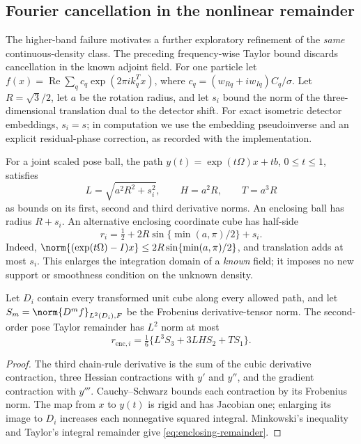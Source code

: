 \subsection{Fourier cancellation in the nonlinear remainder}
\label{app:enclosing-domain}
The higher-band failure motivates a further exploratory refinement of the
\emph{same} continuous-density class. The preceding frequency-wise Taylor
bound discards cancellation in the known adjoint field. For one particle let
\(f(x)=\operatorname{Re}\sum_q c_q\exp(2\pi i k_q^T x)\), where
\(c_q=(w_{Rq}+i w_{Iq})C_q/\sigma\). Let \(R=\sqrt{3}/2\), let \(a\) be
the rotation radius, and let \(s_i\) bound the norm of the three-dimensional
translation dual to the detector shift. For exact isometric detector
embeddings, \(s_i=s\); in computation we use the embedding pseudoinverse and
an explicit residual-phase correction, as recorded with the implementation.

For a joint scaled pose ball, the path \(y(t)=\exp(t\Omega)x+tb\),
\(0\leq t\leq1\), satisfies
\begin{equation}
 L=\sqrt{a^2R^2+s_i^2},\qquad H=a^2R,\qquad T=a^3R
\end{equation}
as bounds on its first, second and third derivative norms. An enclosing ball
has radius \(R+s_i\). An alternative enclosing coordinate cube has half-side
\begin{equation}
 r_i=\tfrac12+2R\sin\{\min(a,\pi)/2\}+s_i.
\end{equation}
Indeed, \(\norm{(\exp(t\Omega)-I)x}\leq
2R\sin\{\min(a,\pi)/2\}\), and translation adds at most \(s_i\).
This enlarges the integration domain of a \emph{known} field; it imposes no
new support or smoothness condition on the unknown density.

\begin{proposition}
Let \(D_i\) contain every transformed unit cube along every allowed path,
and let \(S_m=\norm{D^m f}_{L^2(D_i),F}\) be the Frobenius derivative-tensor
norm. The second-order pose Taylor remainder has \(L^2\) norm at most
\begin{equation}
 r_{\mathrm{enc},i}=\tfrac16\{L^3 S_3+3LH S_2+T S_1\}.
 \label{eq:enclosing-remainder}
\end{equation}
\end{proposition}
\begin{proof}
The third chain-rule derivative is the sum of the cubic derivative contraction,
three Hessian contractions with \(y'\) and \(y''\), and the gradient
contraction with \(y'''\). Cauchy--Schwarz bounds each contraction by its
Frobenius norm. The map from \(x\) to \(y(t)\) is rigid and has Jacobian one;
enlarging its image to \(D_i\) increases each nonnegative squared integral.
Minkowski's inequality and Taylor's integral remainder give
\eqref{eq:enclosing-remainder}.
\end{proof}

